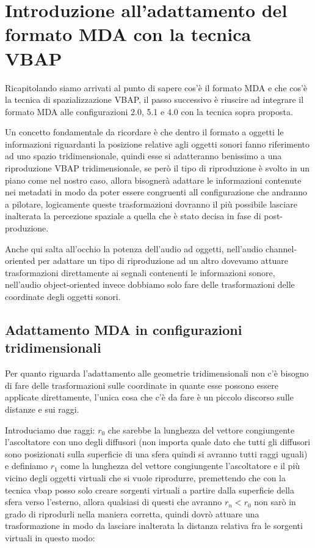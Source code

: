 \documentclass[12pt,a4paper]{report}
\begin{document}
\section{Introduzione all'adattamento del formato MDA con la tecnica VBAP}

Ricapitolando siamo arrivati al punto di sapere cos'è il formato MDA e che cos'è la tecnica di spazializzazione VBAP,
il passo successivo è riuscire ad integrare il formato MDA alle configurazioni 2.0, 5.1 e 4.0 con la tecnica sopra proposta.

Un concetto fondamentale da ricordare è che dentro il formato a oggetti le informazioni riguardanti la posizione relative agli oggetti sonori fanno riferimento ad uno spazio tridimensionale, quindi esse si adatteranno benissimo a una riproduzione VBAP tridimensionale, se però il tipo di riproduzione è svolto in un piano come nel nostro caso, allora bisognerà adattare le informazioni contenute nei metadati in modo da poter essere congruenti all configurazione che andranno a pilotare, logicamente queste trasformazioni dovranno il più possibile lasciare inalterata la percezione spaziale a quella che è stato decisa in fase di post-produzione.

Anche qui salta all'occhio la potenza dell'audio ad oggetti, nell'audio channel-oriented per adattare un tipo di riproduzione ad un altro dovevamo attuare trasformazioni direttamente ai segnali contenenti le informazioni sonore, nell'audio object-oriented invece dobbiamo solo fare delle trasformazioni delle coordinate degli oggetti sonori.

\subsection{Adattamento MDA in configurazioni tridimensionali}

Per quanto riguarda l'adattamento alle geometrie tridimensionali non c'è bisogno di fare delle trasformazioni sulle coordinate in quante esse possono essere applicate direttamente, l'unica cosa che c'è da fare è un piccolo discorso sulle distanze e sui raggi.

Introduciamo due raggi: $r_0$ che sarebbe la lunghezza del vettore congiungente l'ascoltatore con uno degli diffusori (non importa quale dato che tutti gli diffusori sono posizionati sulla superficie di una sfera quindi si avranno tutti raggi uguali) e definiamo $r_1$ come la lunghezza del vettore congiungente l'ascoltatore e il più vicino degli oggetti virtuali che si vuole riprodurre, premettendo che con la tecnica vbap posso solo creare sorgenti virtuali a partire dalla superficie della sfera verso l'esterno, allora qualsiasi di questi che avranno $r_n < r_0$ non sarò in grado di riprodurli nella maniera corretta, quindi dovrò attuare una trasformazione in modo da lasciare inalterata la distanza relativa fra le sorgenti virtuali in questo modo:
\end{document}
